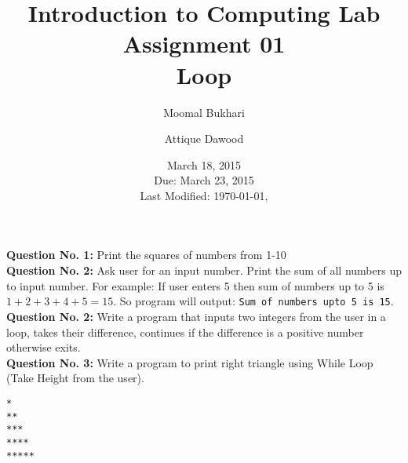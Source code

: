 \documentclass[12pt,a4paper]{article}
\title{Introduction to Computing Lab\\Assignment 01\\Loop}
\author{Moomal Bukhari\and Attique Dawood}
\date{March 18, 2015\\Due: March 23, 2015\\[0.2cm] Last Modified: \today, \currenttime}
\begin{document}
\maketitle
\noindent\textbf{Question No. 1:} Print the squares of numbers from 1-10\\[0.2cm]
\textbf{Question No. 2:} Ask user for an input number. Print the sum of all numbers up to input number. For example: If user enters 5 then sum of numbers up to 5 is $1+2+3+4+5=15$. So program will output: \verb|Sum of numbers upto 5 is 15|.\\[0.2cm]
\textbf{Question No. 2:} Write a program that inputs two integers from the user in a loop, takes their difference, continues if the difference is a positive number otherwise exits.\\[0.2cm]
\textbf{Question No. 3:} Write a program to print right triangle using While Loop (Take Height from the user).\\[0.2cm]
\begin{verbatim}
*
**
***
****
*****
\end{verbatim}
\end{document}
